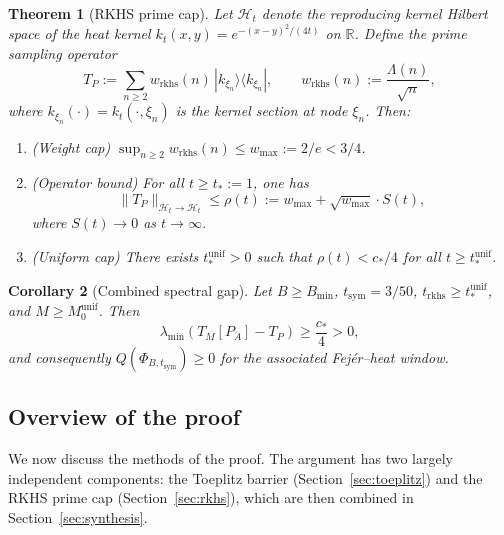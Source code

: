 \documentclass[11pt,a4paper]{article}
\newtheorem{theorem}{Theorem}[section]
\newtheorem{corollary}[theorem]{Corollary}
\theoremstyle{definition}
\theoremstyle{remark}
\newcommand{\R}{\mathbb{R}}
\begin{document}
\begin{theorem}[RKHS prime cap]\label{thm:rkhs-cap}
Let $\mathcal{H}_t$ denote the reproducing kernel Hilbert space of the heat kernel $k_t(x,y) = e^{-(x-y)^2/(4t)}$ on $\R$. Define the prime sampling operator
\begin{equation}\label{eq:TP-def}
  T_P := \sum_{n \geq 2} w_{\mathrm{rkhs}}(n)\, |k_{\xi_n}\rangle \langle k_{\xi_n}|,
  \qquad w_{\mathrm{rkhs}}(n) := \frac{\Lambda(n)}{\sqrt{n}},
\end{equation}
where $k_{\xi_n}(\cdot) = k_t(\cdot, \xi_n)$ is the kernel section at node $\xi_n$. Then:
\begin{enumerate}[label=(\roman*)]
\item (Weight cap) $\sup_{n \geq 2} w_{\mathrm{rkhs}}(n) \leq w_{\max} := 2/e < 3/4$.
\item (Operator bound) For all $t \geq t_* := 1$, one has
\begin{equation}\label{eq:prime-cap}
  \|T_P\|_{\mathcal{H}_t \to \mathcal{H}_t} \leq \rho(t) := w_{\max} + \sqrt{w_{\max}} \cdot S(t),
\end{equation}
where $S(t) \to 0$ as $t \to \infty$.
\item (Uniform cap) There exists $t_*^{\mathrm{unif}} > 0$ such that $\rho(t) < c_*/4$ for all $t \geq t_*^{\mathrm{unif}}$.
\end{enumerate}
\end{theorem}

\begin{corollary}[Combined spectral gap]\label{cor:gap}
Let $B \geq B_{\min}$, $t_{\mathrm{sym}} = 3/50$, $t_{\mathrm{rkhs}} \geq t_*^{\mathrm{unif}}$, and $M \geq M_0^{\mathrm{unif}}$. Then
\begin{equation}\label{eq:gap}
  \lambda_{\min}(T_M[P_A] - T_P) \geq \frac{c_*}{4} > 0,
\end{equation}
and consequently $Q(\Phi_{B,t_{\mathrm{sym}}}) \geq 0$ for the associated Fej\'er--heat window.
\end{corollary}

\subsection{Overview of the proof}

We now discuss the methods of the proof. The argument has two largely independent components: the Toeplitz barrier (Section~\ref{sec:toeplitz}) and the RKHS prime cap (Section~\ref{sec:rkhs}), which are then combined in Section~\ref{sec:synthesis}.
\end{document}
